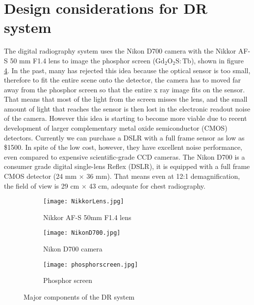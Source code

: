 \section{Design considerations for DR system}
The digital radiography system uses the Nikon D700 camera with the Nikkor AF-S 50 mm F1.4 lens to image the phosphor screen ($\mathrm{Gd_2O_2S:Tb}$), shown in figure \ref{fig:DRcomponents}.  In the past, many has rejected this idea because the optical sensor is too small, therefore to fit the entire scene onto the detector, the camera has to moved far away from the phosphor screen so that the entire x ray image fits on the sensor.  That means that most of the light from the screen misses the lens, and the small amount of light that reaches the sensor is then lost in the electronic readout noise of the camera.  However this idea is starting to become more viable due to recent development of larger complementary metal oxide semiconductor (CMOS) detectors.  Currently we can purchase a DSLR with a full frame sensor as low as \$1500.  In spite of the low cost, however, they have excellent noise performance, even compared to expensive scientific-grade CCD cameras.  The Nikon D700 is a consumer grade digital single-lens Reflex (DSLR), it is equipped with a full frame CMOS detector (24 mm $\times$ 36 mm).  That means even at 12:1 demagnification, the field of view is 29 cm $\times$ 43 cm, adequate for chest radiography.  

\begin{figure}[ht]
	\begin{subfigure}[b]{0.3\linewidth}
		\centering
		\texttt{[image: NikkorLens.jpg]}
		\caption{Nikkor AF-S 50mm F1.4 lens}
		\label{fig:nikonlens}
	\end{subfigure}
	\hspace{0.2cm}
	\begin{subfigure}[b]{0.3\linewidth}
		\centering
		\texttt{[image: NikonD700.jpg]}
		\caption{Nikon D700 camera}
		\label{fig:nikoncamera}
	\end{subfigure}
	\hspace{0.2cm}
	\begin{subfigure}[b]{0.3\linewidth}
		\texttt{[image: phosphorscreen.jpg]}
		\caption{Phosphor screen}
		\label{fig:phosphorscreen}
	\end{subfigure}
\caption{Major components of the DR system}
\label{fig:DRcomponents}
\end{figure}

